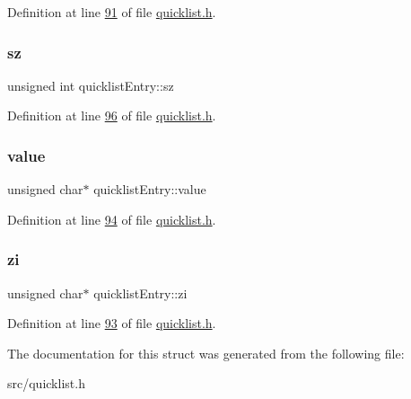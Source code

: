 Definition at line \hyperlink{quicklist_8h_source_l00091}{91} of file \hyperlink{quicklist_8h_source}{quicklist.\+h}.

\mbox{\label{structquicklistEntry_a4b38ddc002996018b8df55926b687619}} 
\subsubsection{\texorpdfstring{sz}{sz}}
{\footnotesize\ttfamily unsigned int quicklist\+Entry\+::sz}



Definition at line \hyperlink{quicklist_8h_source_l00096}{96} of file \hyperlink{quicklist_8h_source}{quicklist.\+h}.

\mbox{\label{structquicklistEntry_ad6128afc65dff9103f6702f5cea78d84}} 
\subsubsection{\texorpdfstring{value}{value}}
{\footnotesize\ttfamily unsigned char$\ast$ quicklist\+Entry\+::value}



Definition at line \hyperlink{quicklist_8h_source_l00094}{94} of file \hyperlink{quicklist_8h_source}{quicklist.\+h}.

\mbox{\label{structquicklistEntry_a874694fe0b87046a740066bd17a1602d}} 
\subsubsection{\texorpdfstring{zi}{zi}}
{\footnotesize\ttfamily unsigned char$\ast$ quicklist\+Entry\+::zi}



Definition at line \hyperlink{quicklist_8h_source_l00093}{93} of file \hyperlink{quicklist_8h_source}{quicklist.\+h}.



The documentation for this struct was generated from the following file\+:\begin{DoxyCompactItemize}
\item 
src/quicklist.\+h\end{DoxyCompactItemize}
